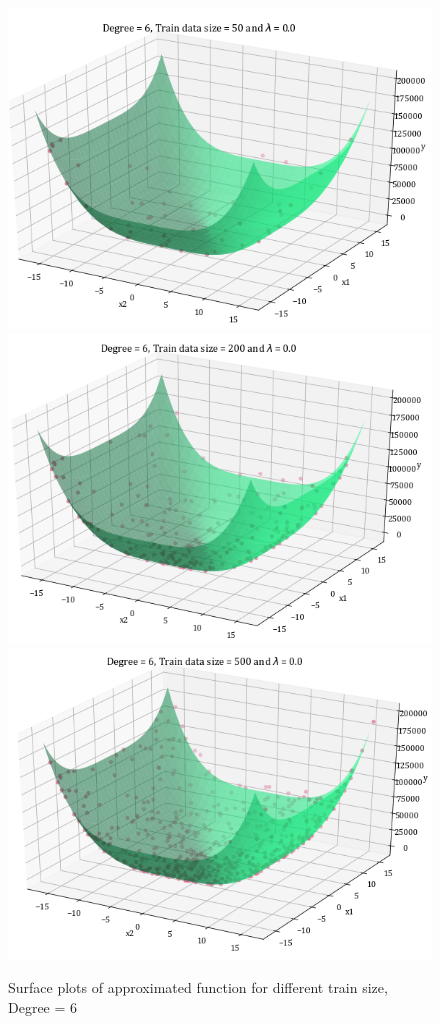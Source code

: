 \documentclass[12pt,a4paper]{article}
\begin{document}
\begin{figure}[H]
    \centering
    \includegraphics[scale=0.6]{images/D=6,T=50,l=0.0.png}
    \includegraphics[scale=0.6]{images/D=6,T=200,l=0.0.png}
    \includegraphics[scale=0.6]{images/D=6,T=500,l=0.0.png}
    \caption{Surface plots of approximated function for different train size, Degree = 6}
    \label{fig:sp_d6}
\end{figure}
\end{document}
